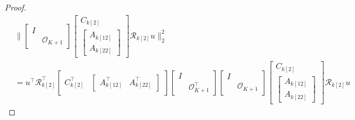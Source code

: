 \documentclass[numbers=noenddot,doctype=mastersthesis,BCOR=15mm,biblatex]{ldvbook}%
\newcommand{\R}{\mathcal{R}} %
\newcommand{\Ob}{\mathcal{O}} %
\newcommand{\eye}{I} %
\begin{document}
\begin{proof}
\begin{align}
		&\Bigg\|
	\begin{bmatrix}
	\eye & \\
	& \Ob_{K+1}
	\end{bmatrix}
	\begin{bmatrix}
	C_{k[2]}\\
	\begin{bmatrix}
	A_{k[12]}\\
	A_{k[22]}
	\end{bmatrix}
	\end{bmatrix}  \R_{k[2]} u\Bigg\|_2^2
	\\
	&=
	u^\top
	\R_{k[2]}^\top
	\begin{bmatrix}
	C_{k[2]}^\top&
	\begin{bmatrix}
	A_{k[12]}^\top&
	A_{k[22]}^\top
	\end{bmatrix}
	\end{bmatrix} 
	\begin{bmatrix}
	\eye & \\
	& \Ob_{K+1}^\top
	\end{bmatrix} 
	\begin{bmatrix}
	\eye & \\
	& \Ob_{K+1}
	\end{bmatrix}
	\begin{bmatrix}
	C_{k[2]}\\
	\begin{bmatrix}
	A_{k[12]}\\
	A_{k[22]}
	\end{bmatrix}
	\end{bmatrix}  
	\R_{k[2]} u
\end{align}

\end{proof}
\end{document}
